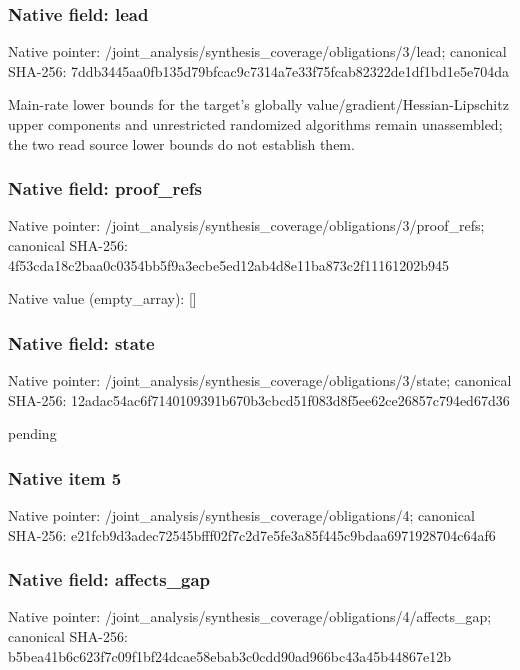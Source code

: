 \documentclass[10pt,a4paper]{article}
\begin{document}
\subsubsection{Native field: lead}
Native pointer: /joint\_\allowbreak{}analysis/synthesis\_\allowbreak{}coverage/obligations/3/lead; canonical SHA-256: 7ddb3445aa0fb135d79bfcac9c7314a7e33f75fcab82322de1df1bd1e5e704da

\begingroup\raggedright\sloppy Main-rate lower bounds for the target's globally value/\allowbreak{}gradient/\allowbreak{}Hessian-Lipschitz upper components and unrestricted randomized algorithms remain unassembled;\allowbreak{} the two read source lower bounds do not establish them.\par\endgroup

\subsubsection{Native field: proof\_\allowbreak{}refs}
Native pointer: /joint\_\allowbreak{}analysis/synthesis\_\allowbreak{}coverage/obligations/3/proof\_\allowbreak{}refs; canonical SHA-256: 4f53cda18c2baa0c0354bb5f9a3ecbe5ed12ab4d8e11ba873c2f11161202b945

Native value (empty\_\allowbreak{}array): []

\subsubsection{Native field: state}
Native pointer: /joint\_\allowbreak{}analysis/synthesis\_\allowbreak{}coverage/obligations/3/state; canonical SHA-256: 12adac54ac6f7140109391b670b3cbcd51f083d8f5ee62ce26857c794ed67d36

\begingroup\raggedright\sloppy pending\par\endgroup

\subsubsection{Native item 5}
Native pointer: /joint\_\allowbreak{}analysis/synthesis\_\allowbreak{}coverage/obligations/4; canonical SHA-256: e21fcb9d3adec72545bfff02f7c2d7e5fe3a85f445c9bdaa6971928704c64af6

\subsubsection{Native field: affects\_\allowbreak{}gap}
Native pointer: /joint\_\allowbreak{}analysis/synthesis\_\allowbreak{}coverage/obligations/4/affects\_\allowbreak{}gap; canonical SHA-256: b5bea41b6c623f7c09f1bf24dcae58ebab3c0cdd90ad966bc43a45b44867e12b
\end{document}
